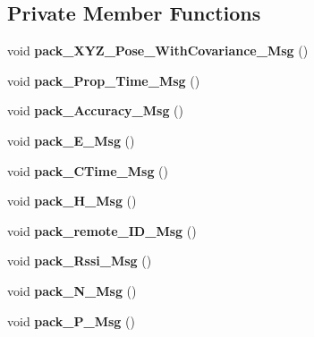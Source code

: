\subsection*{Private Member Functions}
\begin{DoxyCompactItemize}
\item 
\mbox{\label{classUSBL__reader_afa8b1d7df1e92dca0aab40dbe75ce52d}} 
void {\bfseries pack\+\_\+\+X\+Y\+Z\+\_\+\+Pose\+\_\+\+With\+Covariance\+\_\+\+Msg} ()
\item 
\mbox{\label{classUSBL__reader_add8999e41a9e7f5b0e4e2a4b7ae8f272}} 
void {\bfseries pack\+\_\+\+Prop\+\_\+\+Time\+\_\+\+Msg} ()
\item 
\mbox{\label{classUSBL__reader_a11c38ebe64e4e4370dfb21c1b83ec35c}} 
void {\bfseries pack\+\_\+\+Accuracy\+\_\+\+Msg} ()
\item 
\mbox{\label{classUSBL__reader_a9f6a69fc0441c9ed2c3f4b622af2fa23}} 
void {\bfseries pack\+\_\+\+E\+\_\+\+Msg} ()
\item 
\mbox{\label{classUSBL__reader_ad70c647e424b4d1b1757794176ebabbd}} 
void {\bfseries pack\+\_\+\+C\+Time\+\_\+\+Msg} ()
\item 
\mbox{\label{classUSBL__reader_a29ee3574cc5e3b1db3a2a4d2147111ce}} 
void {\bfseries pack\+\_\+\+H\+\_\+\+Msg} ()
\item 
\mbox{\label{classUSBL__reader_a8f9edcefc5187ca5e9df99b9c769fb8d}} 
void {\bfseries pack\+\_\+remote\+\_\+\+I\+D\+\_\+\+Msg} ()
\item 
\mbox{\label{classUSBL__reader_aa15748d7dca00be71d7526b698fdcdab}} 
void {\bfseries pack\+\_\+\+Rssi\+\_\+\+Msg} ()
\item 
\mbox{\label{classUSBL__reader_a501267ad0000764024d02b7dc3d5da2f}} 
void {\bfseries pack\+\_\+\+N\+\_\+\+Msg} ()
\item 
\mbox{\label{classUSBL__reader_a12bad474ef1abae5f851f6ca3081725b}} 
void {\bfseries pack\+\_\+\+P\+\_\+\+Msg} ()

\end{DoxyCompactItemize}
